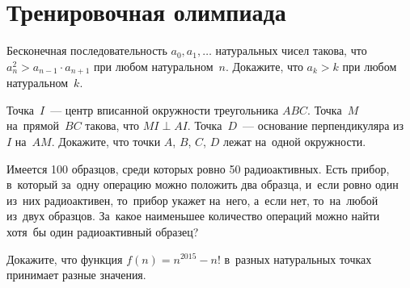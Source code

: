 
\section*{Тренировочная олимпиада}


\begin{problems}

\item
Бесконечная последовательность $a_0, a_1, \ldots$ натуральных чисел такова, что
\(
    a_{n}^2 > a_{n-1} \cdot a_{n+1}
\)
при любом натуральном~$n$.
Докажите, что $a_k > k$ при любом натуральном~$k$.

\item
Точка~$I$~--- центр вписанной окружности треугольника $ABC$.
Точка~$M$ на~прямой~$BC$ такова, что $MI \perp AI$.
Точка~$D$~--- основание перпендикуляра из~$I$ на~$AM$.
Докажите, что точки $A$, $B$, $C$, $D$ лежат на~одной окружности.

\item
Имеется 100 образцов, среди которых ровно 50 радиоактивных.
Есть прибор, в~который за~одну операцию можно положить два образца, и~если
ровно один из~них радиоактивен, то~прибор укажет на~него, а~если нет,
то~на~любой из~двух образцов.
За~какое наименьшее количество операций можно найти хотя~бы один радиоактивный
образец?

\item
Докажите, что функция $f(n) = n^{2015} - n!$ в~разных натуральных точках
принимает разные значения.

\end{problems}

